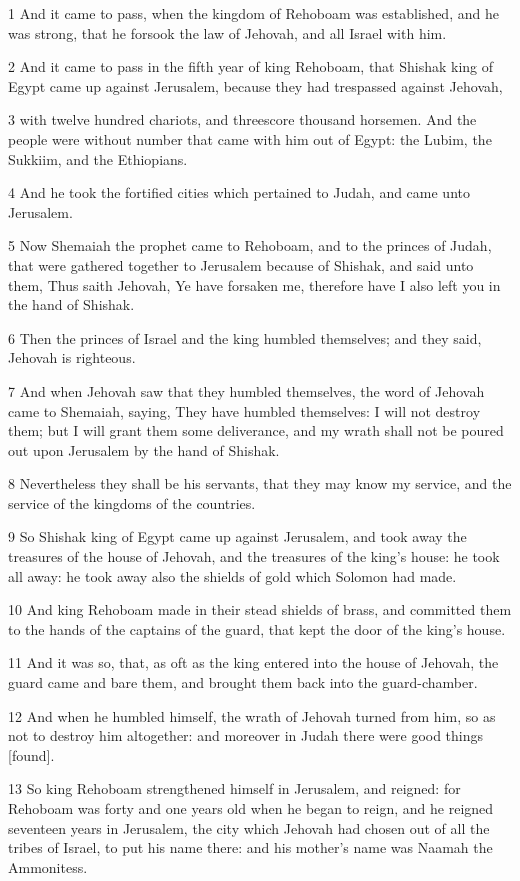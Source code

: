 \par 1 And it came to pass, when the kingdom of Rehoboam was established, and he was strong, that he forsook the law of Jehovah, and all Israel with him.
\par 2 And it came to pass in the fifth year of king Rehoboam, that Shishak king of Egypt came up against Jerusalem, because they had trespassed against Jehovah,
\par 3 with twelve hundred chariots, and threescore thousand horsemen. And the people were without number that came with him out of Egypt: the Lubim, the Sukkiim, and the Ethiopians.
\par 4 And he took the fortified cities which pertained to Judah, and came unto Jerusalem.
\par 5 Now Shemaiah the prophet came to Rehoboam, and to the princes of Judah, that were gathered together to Jerusalem because of Shishak, and said unto them, Thus saith Jehovah, Ye have forsaken me, therefore have I also left you in the hand of Shishak.
\par 6 Then the princes of Israel and the king humbled themselves; and they said, Jehovah is righteous.
\par 7 And when Jehovah saw that they humbled themselves, the word of Jehovah came to Shemaiah, saying, They have humbled themselves: I will not destroy them; but I will grant them some deliverance, and my wrath shall not be poured out upon Jerusalem by the hand of Shishak.
\par 8 Nevertheless they shall be his servants, that they may know my service, and the service of the kingdoms of the countries.
\par 9 So Shishak king of Egypt came up against Jerusalem, and took away the treasures of the house of Jehovah, and the treasures of the king's house: he took all away: he took away also the shields of gold which Solomon had made.
\par 10 And king Rehoboam made in their stead shields of brass, and committed them to the hands of the captains of the guard, that kept the door of the king's house.
\par 11 And it was so, that, as oft as the king entered into the house of Jehovah, the guard came and bare them, and brought them back into the guard-chamber.
\par 12 And when he humbled himself, the wrath of Jehovah turned from him, so as not to destroy him altogether: and moreover in Judah there were good things [found].
\par 13 So king Rehoboam strengthened himself in Jerusalem, and reigned: for Rehoboam was forty and one years old when he began to reign, and he reigned seventeen years in Jerusalem, the city which Jehovah had chosen out of all the tribes of Israel, to put his name there: and his mother's name was Naamah the Ammonitess.
